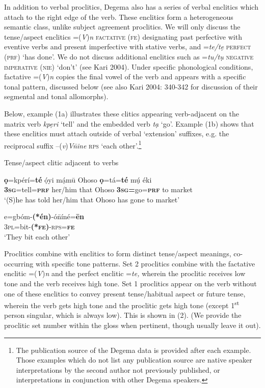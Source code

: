 \documentclass[output=paper]{langsci/langscibook}
\begin{document}
In addition to verbal proclitics, Degema also has a series of verbal enclitics which attach to the right edge of the verb. These enclitics form a heterogeneous semantic class, unlike subject agreement proclitics. We will only discuss the tense/aspect enclitics =(\textit{V})\textit{n} \textsc{factative (fe) }designating past perfective with eventive verbs and present imperfective with stative verbs, and =\textit{te/tẹ} \textsc{perfect} (\textsc{prf}) ‘has done’. We do not discuss additional enclitics such as =\textit{tu/tụ} \textsc{negative imperative (nie)} ‘don’t’ (see Kari 2004). Under specific phonological conditions, factative =(\textit{V})\textit{n} copies the final vowel of the verb and appears with a specific tonal pattern, discussed below (see also Kari 2004: 340-342 for discussion of their segmental and tonal allomorphs).   

  Below, example (1a) illustrates these clitics appearing verb-adjacent on the matrix verb \textit{kpẹri }‘tell’ and the embedded verb \textit{tạ} ‘go’. Example (1b) shows that these enclitics must attach outside of verbal ‘extension’ suffixes, e.g. the reciprocal suffix –(\textit{v})\textit{V\={n}ine} \textsc{rps} ‘each other’.\footnote{The publication source of the Degema data is provided after each example. Those examples which do not list any publication source are native speaker interpretations by the second author not previously published, or interpretations in conjunction with other Degema speakers. 
}

{Tense/aspect clitic adjacent to verbs}
\label{bkm:Ref406316661}



\ea
\gll   \textbf{ọ}=kpérí=\textbf{té}   ọ́yi     mạ́m\={u}   Ohoso   \textbf{ọ}=tá=\textbf{té}     mụ́  éki\\
      \textbf{3}\textbf{\textsc{sg}}=tell=\textbf{\textsc{prf}}   her/him  that     Ohoso  \textbf{3}\textbf{\textsc{sg}}\textbf{=}go=\textbf{\textsc{prf}}  to  market\\
\glt   ‘(S)he has told her/him that Ohoso has gone to market’ \citep[63]{Kari2004}
\z


\ea
\gll   e=gbóm-\textbf{(*én)}{}-ó\={n}íné=\textbf{\={e}n}\\
       3\textsc{pl}=bit-\textbf{(*}\textbf{\textsc{fe}}\textbf{)}{}-\textsc{rps}=\textbf{\textsc{fe}}\\
\glt   ‘They bit each other’ \citep[149]{Kari2004}
\z

Proclitics combine with enclitics to form distinct tense/aspect meanings, co-occurring with specific tone patterns. Set 2 proclitics combine with the factative enclitic =(\textit{V})\textit{n} and the perfect enclitic =\textit{te, }wherein the proclitic receives low tone and the verb receives high tone. Set 1 proclitics appear on the verb without one of these enclitics to convey present tense/habitual aspect or future tense, wherein the verb gets high tone and the proclitic gets high tone (except 1\textsuperscript{st} person singular, which is always low). This is shown in (2). (We provide the proclitic set number within the gloss when pertinent, though usually leave it out).
\end{document}
